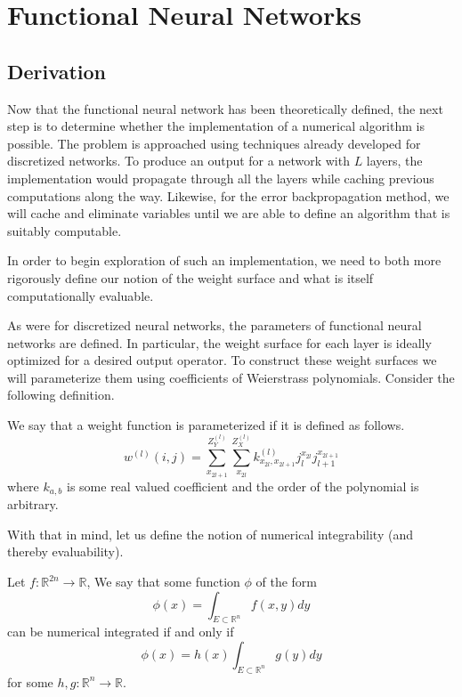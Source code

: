 \section{Functional Neural Networks}




\subsection{Derivation}
Now that the functional neural network has been theoretically defined, the next step is to determine whether the implementation of a numerical algorithm is possible. The problem is approached using techniques already developed for discretized networks. To produce an output for a network with $L$ layers, the implementation would propagate through all the layers while caching previous computations along the way. Likewise, for the error backpropagation method, we will cache and eliminate variables until we are able to define an algorithm that is suitably computable. 

In order to begin exploration of such an implementation, we need to both more rigorously define our notion of the weight surface and what is itself computationally evaluable.


As were for discretized neural networks, the parameters of functional neural networks are defined. In particular, the weight surface for each layer is ideally optimized for a desired output operator. To construct these weight surfaces we will parameterize them using  coefficients of Weierstrass polynomials. Consider the following definition.
\begin{definition} We say that a weight function is parameterized if it is defined as follows.
\begin{equation}
w^{(l)}(i,j) = 
    \sum_{x_{2l+1}}^{Z^{(l)}_Y} \sum_{x_{2l}}^{Z^{(l)}_X} k^{(l)}_{x_{2l},x_{2l+1}}j_{l}^{x_{2l}}j_{l+1}^{x_{2l+1}}
\end{equation}
where $k_{a,b}$ is some real valued coefficient and the order of the polynomial is arbitrary.
\end{definition}

With that in mind, let us define the notion of numerical integrability (and thereby evaluability).
\begin{definition} \label{nint}
Let $f: \mathbb{R}^{2n}\to\mathbb{R}$, 
We say that some function $\phi$ of the form \begin{equation}\phi(x) = \int_{E\subset\mathbb{R}^n}{f(x,y)dy}\end{equation} can be numerical integrated if and only if
\begin{equation}\phi(x) = h(x)\int_{E\subset\mathbb{R}^n}{g(y)dy}\end{equation} for some $h,g: \mathbb{R}^{n}\to\mathbb{R}$.
\end{definition}

